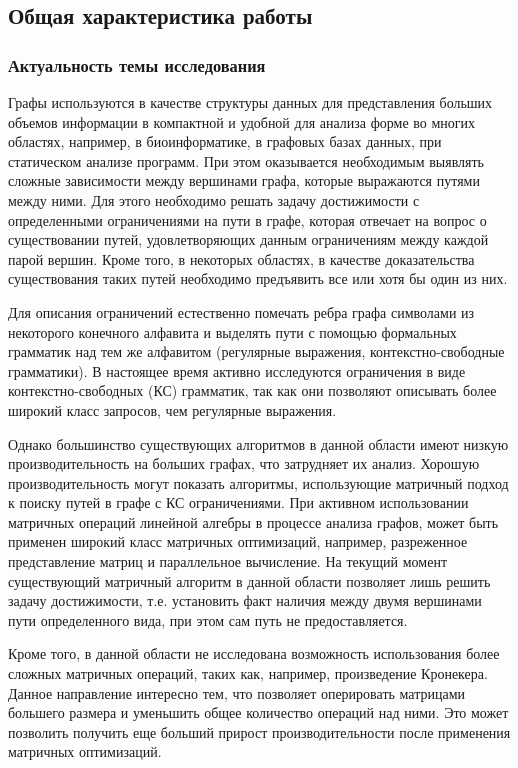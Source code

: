 \subsection*{\Large Общая характеристика работы}
\fontsize{14pt}{15pt}\selectfont
\subsubsection*{\large{Актуальность темы исследования}}
Графы используются в качестве структуры данных для представления больших объемов информации в компактной и удобной для анализа форме во многих областях, например, в биоинформатике, в графовых базах данных, при статическом анализе программ. При этом оказывается необходимым выявлять сложные зависимости между вершинами графа, которые выражаются путями между ними. Для этого необходимо решать задачу достижимости с определенными ограничениями на пути в графе, которая отвечает на вопрос о существовании путей, удовлетворяющих данным ограничениям между каждой парой вершин. Кроме того, в некоторых областях, в качестве доказательства существования таких путей необходимо предъявить все или хотя бы один из них. 


Для описания ограничений естественно помечать ребра графа символами из некоторого конечного алфавита и выделять пути с помощью формальных грамматик над тем же алфавитом (регулярные выражения, контекстно-свободные грамматики). В настоящее время активно исследуются ограничения в виде контекстно-свободных (КС) грамматик, так как они позволяют описывать более широкий класс запросов, чем регулярные выражения.

Однако большинство существующих алгоритмов в данной области имеют низкую производительность на больших графах, что затрудняет их анализ. Хорошую производительность могут показать алгоритмы, использующие матричный подход к поиску путей в графе с КС ограничениями. При активном использовании матричных операций линейной алгебры в процессе анализа графов, может быть применен широкий класс матричных оптимизаций, например, разреженное представление матриц и параллельное вычисление. На текущий момент существующий матричный алгоритм в данной области позволяет лишь решить задачу достижимости, т.е. установить факт наличия между двумя вершинами пути определенного вида, при этом сам путь не предоставляется. 

Кроме того, в данной области не исследована возможность использования более сложных матричных операций, таких как, например, произведение Кронекера. Данное направление интересно тем, что позволяет оперировать матрицами большего размера и уменьшить общее количество операций над ними. Это может позволить получить еще больший прирост производительности после применения матричных оптимизаций.

